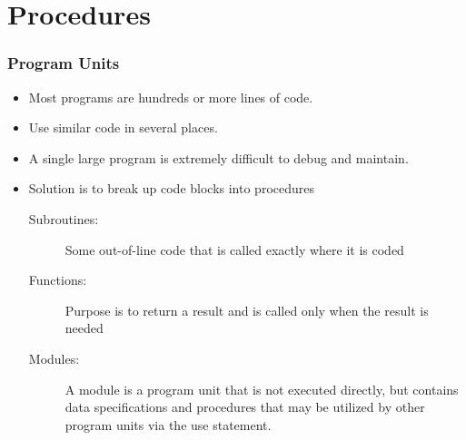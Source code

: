 \documentclass[slidestop,mathserif,compress,xcolor=svgnames]{beamer}
\newenvironment{bblock}[0]
{
\begin{beamerboxesrounded}[upper=uppercol1,lower=lowercol1,shadow=true]}
{\end{beamerboxesrounded}}
\begin{document}
\section{Procedures}
\begin{frame}
  \frametitle{\small Program Units}

  \begin{itemize}
    \item Most programs are hundreds or more lines of code.
    \item Use similar code in several places.
    \item A single large program is extremely difficult to debug and maintain.
    \item Solution is to break up code blocks into procedures
    \begin{description}
      \item[Subroutines:] Some out-of-line code that is called exactly where it is coded
      \item[Functions:] Purpose is to return a result and is called only when the result is needed
      \item[Modules:] A module is a program unit that is not executed directly, but contains data specifications
and procedures that may be utilized by other program units via the use statement.
    \end{description}
  \end{itemize}

  \framebreak

\end{frame}
\end{document}
